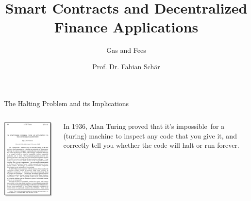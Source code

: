 \documentclass[]{beamer}
\title{Smart Contracts and Decentralized Finance Applications}
\subtitle{Gas and Fees}
\author{Prof. Dr. Fabian Schär}
\institute{University of Basel}
\begin{document}
\thispagestyle{empty}
\begin{frame}[noframenumbering]
	\titlepage
\end{frame}

\begin{frame}{The Halting Problem and its Implications}
\begin{columns}
	\begin{column}{0.3\textwidth}
		\center
		\includegraphics[width=\textwidth , frame]{../assets/images/alan-turing.png}
	\end{column}
	\begin{column}{0.7\textwidth}
		In 1936, Alan Turing proved that it's impossible for a (turing) machine to inspect any code that you give it, and correctly tell you whether the code will halt or run forever.\\

\end{column}
\end{columns}
\end{frame}
\end{document}
